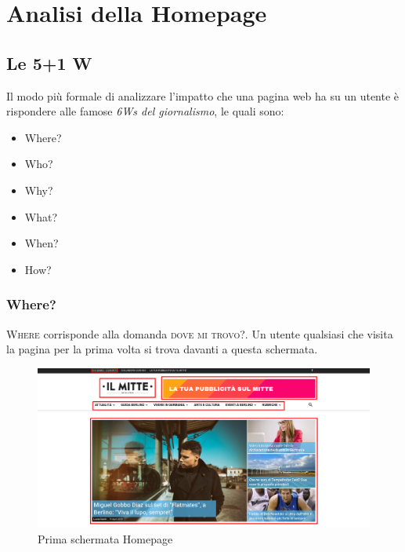 \newpage
\section{Analisi della Homepage}

\subsection{Le 5+1 W}
Il modo più formale di analizzare l'impatto che una pagina web ha su un utente è rispondere alle famose \textit{6Ws del giornalismo}, le quali sono:
\begin{itemize}
\item Where?
\item Who?
\item Why?
\item What?
\item When?
\item How?
\end{itemize}

\subsubsection{Where?}
\textsc{Where} corrisponde alla domanda \textsc{dove mi trovo?}. Un utente qualsiasi che visita la pagina per la prima volta si trova davanti a questa schermata.

\vspace{30pt}
\begin{figure}[htbp]
\begin{center}
\includegraphics[width=35em]{img/home1}
\caption{Prima schermata Homepage}
\end{center}
\end{figure}
\vspace{30pt}


